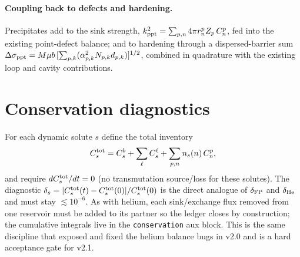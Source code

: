 \documentclass[11pt]{article}
\newcommand{\code}[1]{\texttt{#1}}
\begin{document}
\paragraph{Coupling back to defects and hardening.}
Precipitates add to the sink strength,
$k_{\rm ppt}^2=\sum_{p,n}4\pi r_n^{p}Z_p\,C_n^{p}$, fed into the existing
point-defect balance; and to hardening through a dispersed-barrier sum
$\Delta\sigma_{\rm ppt}=M\mu b\,[\sum_{p,k}(\alpha_{p,k}^2 N_{p,k}d_{p,k})]^{1/2}$,
combined in quadrature with the existing loop and cavity contributions.

\section{Conservation diagnostics}
For each dynamic solute $s$ define the total inventory
\begin{equation}
C_s^{\rm tot}=C_s^{b}+\sum_\ell C_s^{\ell}
  +\sum_{p,n} n_s(n)\,C_n^{p},
\end{equation}
and require $dC_s^{\rm tot}/dt=0$ (no transmutation source/loss for these
solutes). The diagnostic
$\delta_s=|C_s^{\rm tot}(t)-C_s^{\rm tot}(0)|/C_s^{\rm tot}(0)$ is the direct
analogue of $\delta_{\rm FP}$ and $\delta_{\rm He}$ and must stay
$\lesssim10^{-6}$. As with helium, each sink/exchange flux removed from one
reservoir must be added to its partner so the ledger closes by construction;
the cumulative integrals live in the \code{conservation} aux block. This is the
same discipline that exposed and fixed the helium balance bugs in v2.0 and is a
hard acceptance gate for v2.1.

\end{document}
